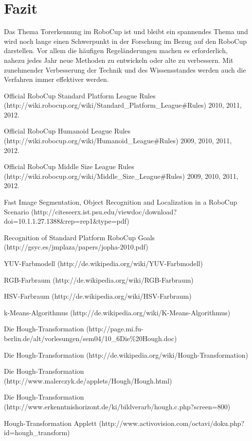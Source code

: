 \documentclass[a4paper,12pt]{article}
\begin{document}
\section{Fazit}
Das Thema Torerkennung im RoboCup ist und bleibt ein spannendes Thema und wird noch lange einen
Schwerpunkt in der Forschung im Bezug auf den RoboCup darstellen. Vor allem die häufigen
Regeländerungen machen es erforderlich, nahezu jedes Jahr neue Methoden zu entwickeln oder alte
zu verbessern. Mit zunehmender Verbesserung der Technik und des Wissensstandes werden auch die
Verfahren immer effektiver werden.

\newpage

\begin{thebibliography}{9}

        Official RoboCup Standard Platform League Rules (http://wiki.robocup.org/wiki/Standard\_Platform\_League\#Rules)
        2010, 2011, 2012.

        Official RoboCup Humanoid League Rules (http://wiki.robocup.org/wiki/Humanoid\_League\#Rules)
        2009, 2010, 2011, 2012.  

        Official RoboCup Middle Size League Rules (http://wiki.robocup.org/wiki/Middle\_Size\_League\#Rules)
        2009, 2010, 2011, 2012.

        Fast Image Segmentation, Object Recognition and Localization in a RoboCup Scenario (http://citeseerx.ist.psu.edu/viewdoc/download?doi=10.1.1.27.1388\&rep=rep1\&type=pdf)

        Recognition of Standard Platform RoboCup Goals (http://gsyc.es/jmplaza/papers/jopha-2010.pdf)

        YUV-Farbmodell (http://de.wikipedia.org/wiki/YUV-Farbmodell)

        RGB-Farbraum (http://de.wikipedia.org/wiki/RGB-Farbraum)

        HSV-Farbraum (http://de.wikipedia.org/wiki/HSV-Farbraum)

        k-Means-Algorithmus (http://de.wikipedia.org/wiki/K-Means-Algorithmus)

        Die Hough-Transformation (http://page.mi.fu-berlin.de/alt/vorlesungen/sem04/10\_6Die\%20Hough.doc)

        Die Hough-Transformation (http://de.wikipedia.org/wiki/Hough-Transformation)

        Die Hough-Transformation (http://www.malerczyk.de/applets/Hough/Hough.html)

        Die Hough-Transformation (http://www.erkenntnishorizont.de/ki/bildverarb/hough.c.php?screen=800)

        Hough-Transformation Applett (http://www.activovision.com/octavi/doku.php?id=hough\_transform)
\end{thebibliography}
\end{document}
